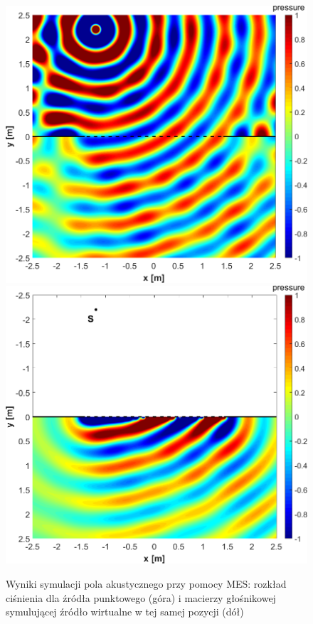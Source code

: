 \documentclass[10pt, a4paper]{article}
\begin{document}
\begin{figure}[!ht]
  \centering
  \includegraphics[height=.41\textheight]{bitgraphics/real_500Hz.png}
  \includegraphics[height=.41\textheight]{bitgraphics/virtual_500Hz.png}
  \caption{Wyniki symulacji pola akustycznego przy pomocy MES:
    rozkład ciśnienia dla źródła punktowego (góra) i macierzy głośnikowej
  symulującej źródło wirtualne w tej samej pozycji (dół)}
  \label{r:fem}
\end{figure}
\end{document}
